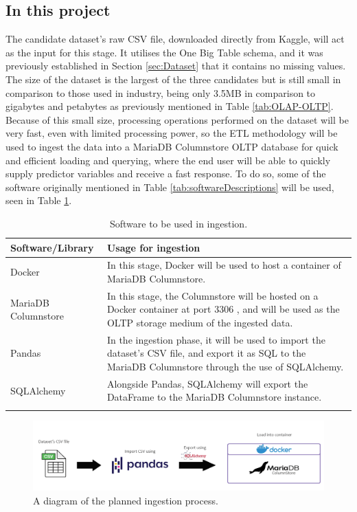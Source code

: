 \documentclass[12pt]{report}
\begin{document}
\subsection{In this project}
The candidate dataset's raw CSV file, downloaded directly from Kaggle, will act as the input for this stage. It utilises the One Big Table schema, 
and it was previously established in Section \ref{sec:Dataset} that it contains no missing values. 
The size of the dataset is the largest of the three candidates but is still
small in comparison to those used in industry, being only 3.5MB in comparison to gigabytes and petabytes as previously 
mentioned in Table \ref{tab:OLAP-OLTP}. Because of this small size, processing operations performed on the dataset 
will be very fast, even with limited processing power, so the ETL methodology will be used to ingest the data 
into a MariaDB Columnstore OLTP database for quick and efficient loading and querying, where the end user will be 
able to quickly supply predictor variables and receive a fast response. To do so, 
some of the software originally mentioned in Table \ref{tab:softwareDescriptions} will be used, seen in Table \ref{tab:IngestionSoftware}.




\begin{longtable}{ |p{}| p{}|}
    \hline
    \cellcolor{blue!25}Software/Library & \cellcolor{blue!25}Usage for ingestion\\
    \hline
    Docker &
    In this stage, Docker will be used to host a container of MariaDB Columnstore.\\
    \hline
    MariaDB Columnstore &
    In this stage, the Columnstore will be hosted on a Docker container at port 3306 \autocite{docker_hub_mariadbcolumnstore_nodate}, 
    and will be used as the OLTP storage medium of the ingested data.\\
    \hline 
    Pandas &
    In the ingestion phase, it will be used to import the dataset's CSV file, and export it as SQL to 
    the MariaDB Columnstore through the use of SQLAlchemy.\\
    \hline
    SQLAlchemy &
    Alongside Pandas, SQLAlchemy will export the DataFrame to the MariaDB Columnstore instance.\\
    \hline
\caption{Software to be used in ingestion.}\label{tab:IngestionSoftware}
\end{longtable}

\begin{figure}[H]
    \centering
    \includegraphics[width=.9\linewidth]{diagrams/Ingestion.png}
    \caption{A diagram of the planned ingestion process.}
    \label{fig:IngestionDiagram}
\end{figure}
\end{document}
